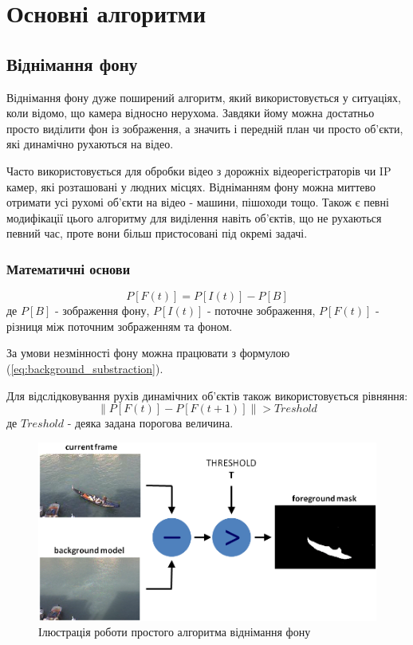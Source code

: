 \section{Основні алгоритми}
\subsection{Віднімання фону}
Віднімання фону дуже поширений алгоритм, який використовується у ситуаціях, коли відомо, що камера відносно нерухома. Завдяки йому можна достатньо просто виділити фон із зображення, а значить і передній план чи просто об'єкти, які динамічно рухаються на відео.

Часто використовується для обробки відео з дорожніх відеорегістраторів чи IP камер, які розташовані у людних місцях. Відніманням фону можна миттево отримати усі рухомі об'єкти на відео - машини, пішоходи тощо. Також є певні модифікації цього алгоритму для виділення навіть об'єктів, що не рухаються певний час, проте вони більш пристосовані під окремі задачі.

\subsubsection{Математичні основи}
\begin{equation}
\label{eq:background_substraction}
P[F(t)] = P[I(t)] - P[B]
\end{equation}
де $P[B]$ - зображення фону, $P[I(t)]$ - поточне зображення, $P[F(t)]$ - різниця між поточним зображенням та фоном.

За умови незмінності фону можна працювати з формулою (\ref{eq:background_substraction}).

Для відслідковування рухів динамічних об'єктів також використовується рівняння:
\begin{equation}
\label{eq:frames_difference}
\|P[F(t)] - P[F(t+1)]\| > Treshold
\end{equation}
де $Treshold$ - деяка задана порогова величина.

\begin{figure}[H]
	\includegraphics[width=0.9\linewidth]{theory/img/background_substraction}
	\caption{Ілюстрація роботи простого алгоритма віднімання фону}
\end{figure}

